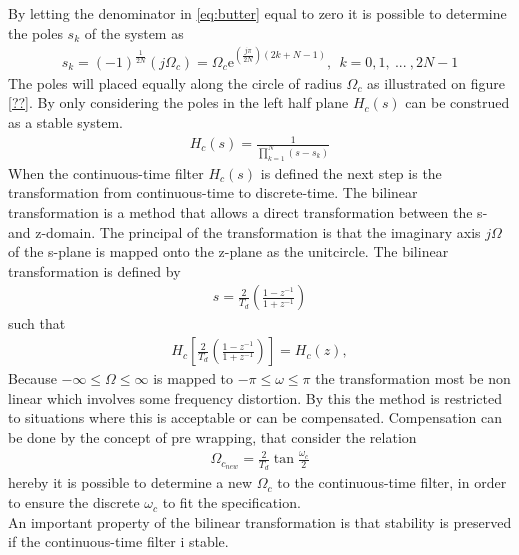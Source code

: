 By letting the denominator in \eqref{eq:butter} equal to zero it is possible to determine the poles $s_k$ of the system as 
\begin{align}
s_k = (-1)^{\frac{1}{2N}}\left(j\Omega_c\right)=\Omega_c\text{e}^{\left(\frac{j\pi}{2N}\right)\left(2k+N-1\right)}, \ \ k=0,1,\ ... \ , 2N-1 
\end{align}   
The poles will placed equally along the circle of radius $\Omega_c$ as illustrated on figure \ref{??}. By only considering the poles in the left half plane $H_c(s)$ can be construed as a stable system. 
\begin{align}
H_c(s)=\frac{1}{\prod_{k=1}^{N}(s-s_k)}
\end{align}    
When the continuous-time filter $H_c(s)$ is defined the next step is the transformation from continuous-time to discrete-time. The bilinear transformation is a method that allows a direct transformation between the s- and z-domain. The principal of the transformation is that the imaginary axis $j\Omega$ of the s-plane is mapped onto the z-plane as the unitcircle. The bilinear transformation is defined by 
\begin{align}
s=\frac{2}{T_d}\left(\frac{1-z^{-1}}{1+z^{-1}}\right) 
\end{align}
such that 
\begin{align}
H_c\left[\frac{2}{T_d}\left(\frac{1-z^{-1}}{1+z^{-1}}\right)\right]=H_c(z), 
\end{align}  
Because $-\infty \leq \Omega \leq \infty $ is mapped to $-\pi \leq \omega \leq \pi$ the transformation most be non linear which involves some frequency distortion. By this the method is restricted to situations where this is acceptable or can be compensated. Compensation can be done by the concept of pre wrapping, that consider the relation 
\begin{align}
\Omega_{c_{new}}=\frac{2}{T_d}\tan\frac{\omega_c}{2}
\end{align}
hereby it is possible to determine a new $\Omega_c$ to the continuous-time filter, in order to ensure the discrete $\omega_c$ to fit the specification.\\
An important property of the bilinear transformation is that stability is preserved if the continuous-time filter i stable. \\


%
%
 

